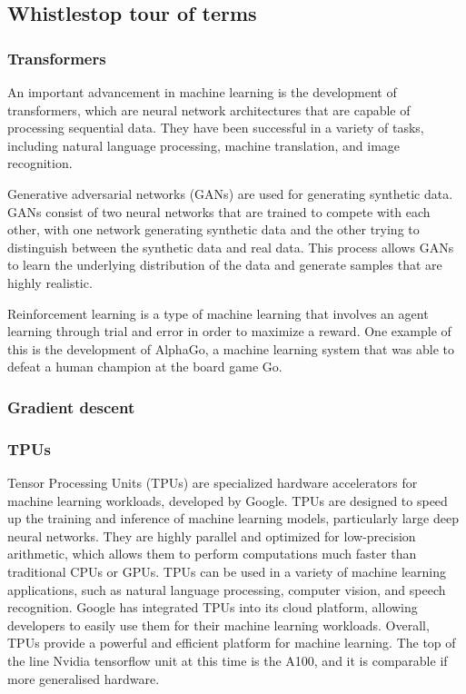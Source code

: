 \subsection{Whistlestop tour of terms}
\subsubsection{Transformers}
An important advancement in machine learning is the development of transformers, which are neural network architectures that are capable of processing sequential data. They have been successful in a variety of tasks, including natural language processing, machine translation, and image recognition. \par
Generative adversarial networks (GANs) are used for generating synthetic data. GANs consist of two neural networks that are trained to compete with each other, with one network generating synthetic data and the other trying to distinguish between the synthetic data and real data. This process allows GANs to learn the underlying distribution of the data and generate samples that are highly realistic.\par
Reinforcement learning is a type of machine learning that involves an agent learning through trial and error in order to maximize a reward. One example of this is the development of AlphaGo, a machine learning system that was able to defeat a human champion at the board game Go.\par
\subsubsection{Gradient descent}
\subsubsection{TPUs}
Tensor Processing Units (TPUs) are specialized hardware accelerators for machine learning workloads, developed by Google. TPUs are designed to speed up the training and inference of machine learning models, particularly large deep neural networks. They are highly parallel and optimized for low-precision arithmetic, which allows them to perform computations much faster than traditional CPUs or GPUs. TPUs can be used in a variety of machine learning applications, such as natural language processing, computer vision, and speech recognition. Google has integrated TPUs into its cloud platform, allowing developers to easily use them for their machine learning workloads. Overall, TPUs provide a powerful and efficient platform for machine learning.
The top of the line Nvidia tensorflow unit at this time is the A100, and it is comparable if more generalised hardware.
